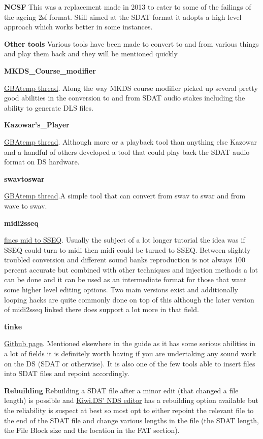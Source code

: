 \documentclass[
]{book}
\begin{document}
\textbf{NCSF} This was a replacement made in 2013 to cater to some of the failings of the ageing 2sf format. Still aimed at the SDAT format it adopts a high level approach which works better in some instances.

\textbf{Other tools} Various tools have been made to convert to and from various things and play them back and they will be mentioned quickly

\textbf{MKDS\_Course\_modifier}

\href{http://gbatemp.net/topic/299444-mkds-course-modifier/}{GBAtemp thread}. Along the way MKDS course modifier picked up several pretty good abilities in the conversion to and from SDAT audio stakes including the ability to generate DLS files.

\textbf{Kazowar's\_Player}

\href{http://gbatemp.net/topic/306997-nds-music-player/}{GBAtemp thread}. Although more or a playback tool than anything else Kazowar and a handful of others developed a tool that could play back the SDAT audio format on DS hardware.

\textbf{swavtoswar}

\href{http://gbatemp.net/t243430-swav-to-swar-converter}{GBAtemp thread}.A simple tool that can convert from swav to swar and from wave to swav.

\textbf{midi2sseq}

\href{http://fincs.drunkencoders.com/2011/07/03/mid-to-sseq-converter/}{fincs mid to SSEQ}. Usually the subject of a lot longer tutorial the idea was if SSEQ could turn to midi then midi could be turned to SSEQ. Between slightly troubled conversion and different sound banks reproduction is not always 100 percent accurate but combined with other techniques and injection methods a lot can be done and it can be used as an intermediate format for those that want some higher level editing options. Two main versions exist and additionally looping hacks are quite commonly done on top of this although the later version of midi2sseq linked there does support a lot more in that field.

\textbf{tinke}

\href{https://github.com/pleonex/tinke}{Github page}. Mentioned elsewhere in the guide as it has some serious abilities in a lot of fields it is definitely worth having if you are undertaking any sound work on the DS (SDAT or otherwise). It is also one of the few tools able to insert files into SDAT files and repoint accordingly.

\textbf{Rebuilding} Rebuilding a SDAT file after a minor edit (that changed a file length) is possible and \href{http://filetrip.net/nds-downloads/utilities/download-nds-editor-01-f5658.html}{Kiwi.DS' NDS editor} has a rebuilding option available but the reliability is suspect at best so most opt to either repoint the relevant file to the end of the SDAT file and change various lengths in the file (the SDAT length, the File Block size and the location in the FAT section).
\end{document}
